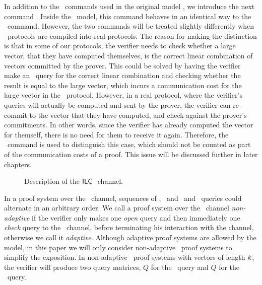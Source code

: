 In addition to the \ILC\ commands used in the original model \cite{BootleCGGHJ17}, we introduce the next command \ILCcheck. Inside the \ILC \ model, this command behaves in an identical way to the \ILCsend\ command. However, the two commands will be treated slightly differently when \ILC\ protocols are compiled into real protocols. The reason for making the distinction is that in some of our protocols, the verifier needs to check whether a large vector, that they have computed themselves, is the correct linear combination of vectors committed by the prover. This could be solved by having the verifier make an \ILCsend\ query for the correct linear combination and checking whether the result is equal to the large vector, which incurs a communication cost for the large vector in the \ILC\ protocol. However, in a real protocol, where the verifier's queries will actually be computed and sent by the prover, the verifier can re-commit to the vector that they have computed, and check against the prover's commitments. In other words, since the verifier has already computed the vector for themself, there is no need for them to receive it again. Therefore, the \ILCcheck\ command is used to distinguish this case, which should not be counted as part of the communication costs of a proof. This issue will be discussed further in later chapters.

\begin{figure}[htb]
\caption{Description of the $\mathsf{ILC}~$ channel.}\label{ILCSyntaxFigure11}
\end{figure}

In a proof system over the \ILC\ channel, sequences of \ILCcommit, \ILCsend\ and \ILCopen\ and \ILCcheck\ queries could alternate in an arbitrary order. We call a proof system over the \ILC\ channel \emph{non-adaptive} if the verifier only makes one \emph{open} query and then immediately one \emph{check} query to the \ILC\ channel, before terminating his interaction with the channel, %
 otherwise we call it \emph{adaptive}. Although adaptive proof systems are allowed by the model, in this paper we will only consider non-adaptive \ILC\ proof systems to simplify the exposition. In non-adaptive \ILC\ proof systems with vectors of length $k$, the verifier will produce two query matrices, $Q$ for the \ILCopen\ query and $Q$ for the \ILCcheck\ query. 

